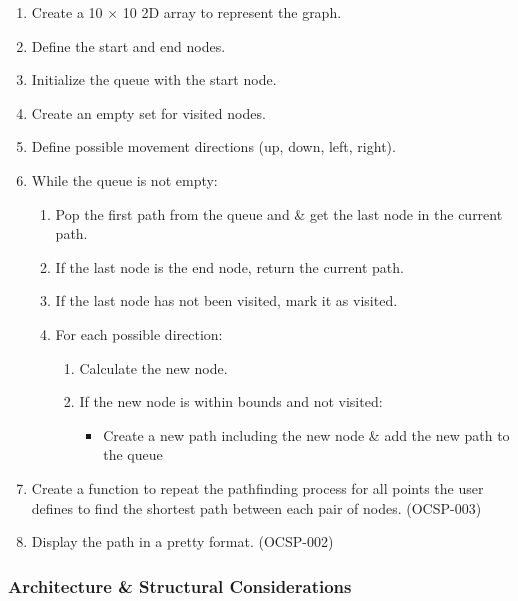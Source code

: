 \begin{enumerate}
    \item Create a 10 $\times$ 10 2D array to represent the graph.
    \item Define the start and end nodes.
    \item Initialize the queue with the start node.
    \item Create an empty set for visited nodes.
    \item Define possible movement directions (up, down, left, right).
    \item While the queue is not empty:
        \begin{enumerate}
            \item Pop the first path from the queue and \& get the last node in the current path.
            \item If the last node is the end node, return the current path.
            \item If the last node has not been visited, mark it as visited.
            \item For each possible direction:
                \begin{enumerate}
                    \item Calculate the new node.
                    \item If the new node is within bounds and not visited:
                        \begin{itemize}
                            \item Create a new path including the new node \& add the new path to the queue
                        \end{itemize}
                \end{enumerate}
        \end{enumerate}
    \item Create a function to repeat the pathfinding process for all points the user defines to find the shortest path between each pair of nodes. (OCSP-003)
    \item Display the path in a pretty format. (OCSP-002)
\end{enumerate}

\subsubsection{Architecture \& Structural Considerations}

